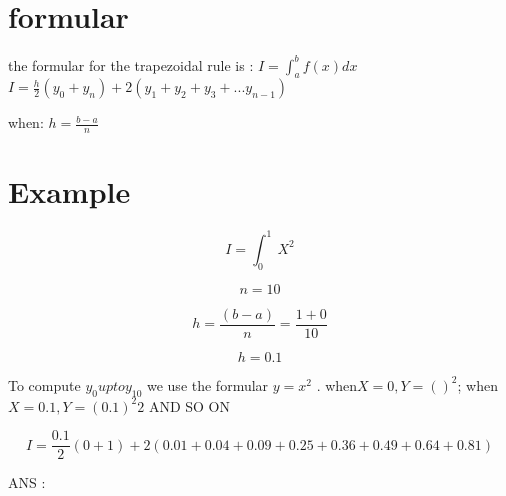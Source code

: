 \documentclass{article}
\begin{document}
\section{formular}
the formular for the trapezoidal rule is :
 $ I=\int_{a}^{b} f(x) dx$
$ I = \frac{h}{2} (y_{0} + y_{n}) + 2(y_{1} + y_{2} + y_{3} + ... y_{n-1})$

when:
$ h = \frac{b-a}{n} $

\section{Example}

 $$ I=\int_{0}^{1}\ X^2$$

$$n=10$$

$$h = \frac{(b-a)}{n} =\frac{1+0}{10}$$

$$h=0.1$$

To compute $y_{0} upto y_{10}$ we use the formular $y=x^2$ .
	when$ X = 0 , Y = ()^{2}$; when$ X= 0.1 , Y= (0.1)^2{2}$ AND SO ON

$$ I = \frac{0.1}{2} (0 +1) + 2(0.01 + 0.04+0.09+ 0.25 + 0.36 + 0.49 + 0.64 + 0.81)$$

ANS : 
\end{document}

